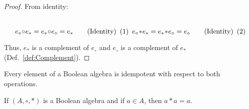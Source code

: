     \begin{proof}
        From identity:
        \par\vspace{-2.5ex}
        \begin{subequations}
            \begin{minipage}[b]{0.49\textwidth}
                \centering
                \begin{equation}
                    e_{\circ}\circ{e}_{*}=e_{*}\circ{e}_{\circ}=e_{*}
                    \tag{Identity}
                \end{equation}
            \end{minipage}
            \hfill
            \begin{minipage}[b]{0.49\textwidth}
                \centering
                \begin{equation}
                    e_{\circ}*{e}_{*}=e_{*}*e_{\circ}=e_{\circ}
                    \tag{Identity}
                \end{equation}
            \end{minipage}
        \end{subequations}
        \par\vspace{2.5ex}
        Thus, $e_{*}$ is a complement of $e_{\circ}$ and $e_{\circ}$ is a
        complement of $e_{*}$ (Def.~\ref{def:Complement}).
    \end{proof}
    Every element of a Boolean algebra is idempotent with respect to both
    operations.
    \begin{theorem}
        \label{thm:Bool_Alg_Idempotent_of_Star}%
        If $(A,\circ,*)$ is a Boolean algebra and if $a\in{A}$, then $a*a=a$.
    \end{theorem}

